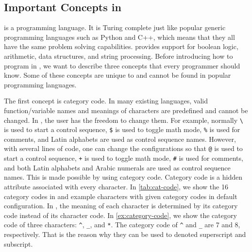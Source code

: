\documentclass{ltugboat}
\begin{document}
\subsection{Important Concepts in \LT{}}\label{sec:important-concepts}

\LT{} is a programming language. 
It is Turing complete just like popular generic programming languages such as Python and C++, which means that they all have the same problem solving capabilities.
\LT{} provides support for boolean logic, arithmetic, data structures, and string processing.
Before introducing how to program in \LT{}, we want to describe three concepts that every \LT{} programmer should know.
Some of these concepts are unique to \LT{} and cannot be found in popular programming languages.

The first concept is category code.
In many existing languages, valid function/variable names and meanings of characters are predefined and cannot be changed.
In \LT{}, the user has the freedom to change them.
For example, normally \verb|\| is used to start a control sequence, \verb|$| is used to toggle math mode, \verb|%| is used for comments, and Latin alphabets are used as control sequence names.
However, with several lines of code, one can change the configurations so that \verb|@| is used to start a control sequence, \verb|+| is used to toggle math mode, \verb|#| is used for comments, and both Latin alphabets and Arabic numerals are used as control sequence names.
This is made possible by using category code.
Category code is a hidden attribute associated with every character.
In \cref{tab:cat-code}, we show the 16 category codes in \LT{} and example characters with given category codes in default \LT{} configuration.
In \LT{}, the meaning of each character is determined by its category code instead of its character code. 
In \cref{ex:category-code}, we show the category code of three characters: \verb|^|, \verb|_|, and \verb|*|.
The category code of \verb|^| and \verb|_| are 7 and 8, respectively. 
That is the reason why they can be used to denoted superscript and subscript.
\end{document}
